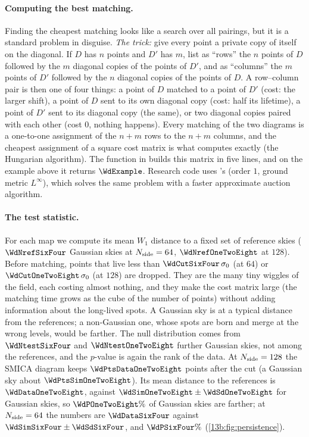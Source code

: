 \paragraph{Computing the best matching.} Finding the cheapest matching looks like a search over all pairings, but
it is a standard problem in disguise. \emph{The trick:} give every point a private copy of itself on the
diagonal. If $D$ has $n$ points and $D'$ has $m$, list as ``rows'' the $n$ points of $D$ followed by the $m$
diagonal copies of the points of $D'$, and as ``columns'' the $m$ points of $D'$ followed by the $n$ diagonal copies
of the points of $D$. A row--column pair is then one of four things: a point of $D$ matched to a point of $D'$ (cost:
the larger shift), a point of $D$ sent to its own diagonal copy (cost: half its lifetime), a point of $D'$ sent to
its diagonal copy (the same), or two diagonal copies paired with each other (cost $0$, nothing happens). Every
matching of the two diagrams is a one-to-one assignment of the $n+m$ rows to the $n+m$ columns, and the cheapest
assignment of a square cost matrix is what  computes exactly (the
Hungarian algorithm). The function  in  builds this matrix in
five lines, and on the example above it returns $\WdExample$. Research code uses 's
 (order $1$, ground metric $L^\infty$), which solves the same problem with a faster
approximate auction algorithm.

\paragraph{The test statistic.} For each map we compute its mean $W_1$ distance to a fixed set of reference skies
($\WdNrefSixFour$ Gaussian skies at $N_{\rm side}=64$, $\WdNrefOneTwoEight$ at $128$). Before matching, points that
live less than $\WdCutSixFour\,\sigma_0$ (at $64$) or $\WdCutOneTwoEight\,\sigma_0$ (at $128$) are dropped. They are
the many tiny wiggles of the field, each costing almost nothing, and they make the cost matrix large (the matching
time grows as the cube of the number of points) without adding information about the long-lived spots. A Gaussian sky
is at a typical distance from the references; a non-Gaussian one, whose spots are born and merge at the wrong levels,
would be farther. The null distribution comes from $\WdNtestSixFour$ and $\WdNtestOneTwoEight$ further Gaussian skies,
not among the references, and the $p$-value is again the rank of the data. At $N_{\rm side}=128$ the SMICA diagram
keeps $\WdPtsDataOneTwoEight$ points after the cut (a Gaussian sky about $\WdPtsSimOneTwoEight$). Its mean distance to
the references is $\WdDataOneTwoEight$, against
$\WdSimOneTwoEight\pm\WdSdOneTwoEight$ for Gaussian skies, so $\WdPOneTwoEight\%$ of Gaussian skies are farther; at
$N_{\rm side}=64$ the numbers are $\WdDataSixFour$ against $\WdSimSixFour\pm\WdSdSixFour$, and $\WdPSixFour\%$
(\cref{13b:fig:persistence}).

